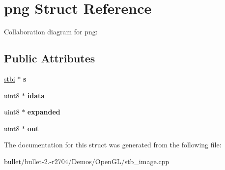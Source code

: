 \hypertarget{structpng}{\section{png Struct Reference}
\label{structpng}
}


Collaboration diagram for png\+:
\subsection*{Public Attributes}
\begin{DoxyCompactItemize}
\item 
\hypertarget{structpng_a77d3bfd0ae8f598a475317ed39e78fd0}{\hyperlink{structstbi}{stbi} $\ast$ {\bfseries s}}\label{structpng_a77d3bfd0ae8f598a475317ed39e78fd0}

\item 
\hypertarget{structpng_a5cd944fdf0f0417a344bcc538ed98ed6}{uint8 $\ast$ {\bfseries idata}}\label{structpng_a5cd944fdf0f0417a344bcc538ed98ed6}

\item 
\hypertarget{structpng_a474dd0da8ac0347924e68f5de7e68c55}{uint8 $\ast$ {\bfseries expanded}}\label{structpng_a474dd0da8ac0347924e68f5de7e68c55}

\item 
\hypertarget{structpng_ada33c39620ad9a647c088c40d21887f6}{uint8 $\ast$ {\bfseries out}}\label{structpng_ada33c39620ad9a647c088c40d21887f6}

\end{DoxyCompactItemize}


The documentation for this struct was generated from the following file\+:\begin{DoxyCompactItemize}
\item 
bullet/bullet-\/2.-\/r2704/\+Demos/\+Open\+G\+L/stb\+\_\+image.\+cpp\end{DoxyCompactItemize}
